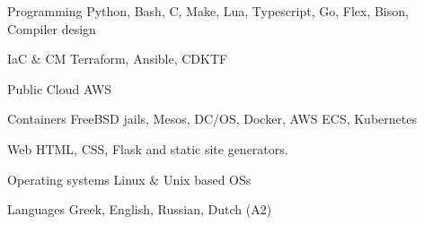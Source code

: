 


\begin{cvskills}


\cvskill
{Programming} %
{Python, Bash, C, Make, Lua, Typescript, Go, Flex, Bison, Compiler design} %


\cvskill
		{IaC \& CM} %
{Terraform, Ansible, CDKTF} %


\cvskill
{Public Cloud} %
{AWS} %


\cvskill
{Containers} %
{FreeBSD jails, Mesos, DC/OS, Docker, AWS ECS, Kubernetes} %


\cvskill
{Web} %
{HTML, CSS, Flask and static site generators.} %


\cvskill
{Operating systems} %
{Linux \& Unix based OSs} %




\cvskill
{Languages} %
{Greek, English, Russian, Dutch (A2)} %

\end{cvskills}
